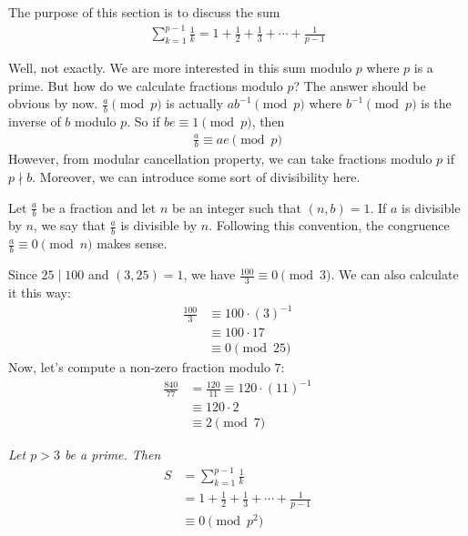 \documentclass[12pt]{subfile}
\begin{document}
	The purpose of this section is to discuss the sum
		\begin{align*}
			\sum_{k=1}^{p-1} \frac{1}{k} = 1+\frac{1}{2}+ \frac{1}{3}+\cdots+ \frac{1}{p-1}
		\end{align*}

	Well, not exactly. We are more interested in this sum modulo $p$ where $p$ is a prime. But how do we calculate fractions modulo $p$? The answer should be obvious by now. $\frac{a}{b}\pmod p$ is actually $ab^{-1}\pmod p$ where $b^{-1}\pmod p$ is the inverse of $b$ modulo $p$. So if $be\equiv1\pmod p$, then
		\begin{align*}
			\frac{a}{b}\equiv ae\pmod p
		\end{align*}
	However, from modular cancellation property, we can take fractions modulo $p$ if $p\nmid b$. Moreover, we can introduce some sort of divisibility here.

	Let $ \frac{a}{b}$ be a fraction and let $n$ be an integer such that $(n,b)=1$. If $a$ is divisible by $n$, we say that $ \frac{a}{b}$ is divisible by $n$. Following this convention, the congruence $\frac{a}{b} \equiv 0 \pmod n$ makes sense.
		\begin{example}
			Since $25 \mid 100$ and $(3,25)=1$, we have $\frac{100}{3} \equiv 0 \pmod 3$. We can also calculate it this way:
				\begin{align*}
					\frac{100}{3}   &\equiv 100 \cdot (3)^{-1} \\
					&\equiv 100 \cdot 17\\
					&\equiv 0 \pmod{25}
				\end{align*}
			Now, let's compute a non-zero fraction modulo $7$:
				\begin{align*}
					\frac{840}{77} &= \frac{120}{11} \equiv 120 \cdot (11)^{-1}\\
					&\equiv 120 \cdot 2 \\
					& \equiv 2 \pmod{7}
				\end{align*}
		\end{example}


		\begin{theorem}\slshape\label{thm:wolst}
			Let $p>3$ be a prime. Then
			\begin{align*}
				S
					& = \sum_{k=1}^{p-1} \frac{1}{k}\\
					& = 1+\frac{1}{2}+ \frac{1}{3}+\cdots+ \frac{1}{p-1}\\
					& \equiv 0 \pmod{p^2}
			\end{align*}
		\end{theorem}
\end{document}
